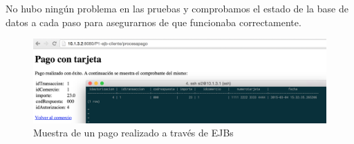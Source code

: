 \documentclass[a4paper, 10pt]{article}
\begin{document}
	 No hubo ningún problema en las pruebas y comprobamos el estado de la base de datos a cada paso para asegurarnos de que funcionaba correctamente.

	 \begin{figure}[hbtp]
	 	\centering
	 	\includegraphics[width=1.1\textwidth]{pantallazos/ejercicio4.png}
	 	\caption{Muestra de un pago realizado a través de EJBs}
	 \end{figure}

\newpage
\end{document}
